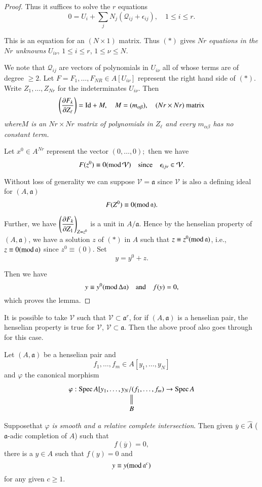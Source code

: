 \begin{proof}
Thus it suffices to solve the $r$ equations
\begin{equation*}
0=U_{i}+\sum_{j}N_{j}(\mathcal{Q}_{ij}+\epsilon_{ij}),\quad 1\leq
i\leq r.\tag{*} 
\end{equation*}

This is an equation for an $(N\times 1)$ matrix. Thus $(*)$ gives $Nr$
{\em equations in the $Nr$ unknowns} $U_{i\nu}$, $1\leq i\leq r$,
$1\leq \nu\leq N$.

We note that $\mathcal{Q}_{ij}$ are vectors of polynomials in
$U_{i\nu}$ all of whose terms are of degree $\geq 2$. Let
$F=F_{1},\ldots,F_{NR}\in A[U_{i\nu}]$ represent the right hand side
of $(*)$. Write $Z_{1},\ldots,Z_{Nr}$ for the indeterminates
$U_{i\nu}$. Then 
$$
\left(\frac{\partial F_{k}}{\partial Z_{\ell}}\right)=\text{Id}+M,\quad
M=(m_{\alpha\beta}),\quad (Nr\times Nr)\text{~ matrix}
$$
{\em where\pageoriginale $M$ is an $Nr\times Nr$ matrix of polynomials
  in $Z_{\ell}$ and every $m_{\alpha\beta}$ has no constant term.}

Let $x^{0}\in A^{Nr}$ represent the vector $(0,\ldots,0);$ then we
have
$$
F(z^{0})\equiv 0(\text{mod\,}\mathcal{V})\quad\text{since}\quad
\epsilon_{ij\nu}\in \mathcal{V}.
$$

Without loss of generality we can suppose $\mathcal{V}=\mathfrak{a}$
since $\mathcal{V}$ is also a defining ideal for $(A,\mathfrak{a})$
$$
F(Z^{0})\equiv 0(\text{mod\,}\mathfrak{a}).
$$

Further, we have $\left(\dfrac{\partial F_{k}}{\partial Z_{1}}\right)_{Z=z^{0}}$
is a unit in $A/\mathfrak{a}$. Hence by the henselian property of
$(A,\mathfrak{a})$, we have a solution $z$ of $(*)$ in $A$ such that
$z\equiv z^{0}\break(\text{mod\,}\mathfrak{a})$, i.e., $z\equiv
0(\text{mod\,}\mathfrak{a})$ since $z^{0}\equiv (0)$. Set 
$$
y=y^{0}+z.
$$

Then we have
$$
y\equiv y^{0}(\text{mod\,}\Delta\mathfrak{a})\quad\text{and}\quad
f(y)=0,
$$
which proves the lemma.
\end{proof}

\begin{remark}\label{part2-rem4.1}
It is possible to take $\mathcal{V}$ such that $\mathcal{V}\subset
\mathfrak{a}^{r}$, for if $(A,\mathfrak{a})$ is a henselian pair, the
henselian property is true for $\mathcal{V}$, $\mathcal{V}\subset
\mathfrak{a}$. Then the above proof also goes through for this case.
\end{remark}

\begin{coro*}
Let $(A,\mathfrak{a})$ be a henselian pair and
$$
f_{1},\ldots,f_{m}\in A[y_{1},\ldots,y_{N}]
$$
and $\varphi$ the canonical morphism
\[
\xymatrix@R=.5cm{
\varphi:\Spec A[y_{1},\ldots,y_{N}/(f_{1},\ldots,f_{m})\to \Spec
  A\ar@{=}[d]\\
B
}
\]

Suppose\pageoriginale that $\varphi$ {\em is smooth and a relative
  complete intersection}. Then given $\overline{y}\in \hat{A}$
($\mathfrak{a}$-adic completion of $A$) such that
$$
f(\overline{y})=0,
$$
there is a $y\in A$ such that $f(y)=0$ and
$$
y\equiv y(\text{mod\,}\mathfrak{a}^{c})
$$
for any given $c\geq 1$.
\end{coro*}

